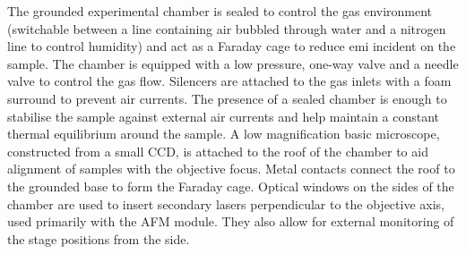 \documentclass{article}
\begin{document}
The grounded experimental chamber is sealed to control the gas environment (switchable between a line containing air bubbled through water and a nitrogen line to control humidity) and act as a Faraday cage to reduce \gls{emi} incident on the sample. The chamber is equipped with a low pressure, one-way valve and a needle valve to control the gas flow. Silencers are attached to the gas inlets with a foam surround to prevent air currents. The presence of a sealed chamber is enough to stabilise the sample against external air currents and help maintain a constant thermal equilibrium around the sample. A low magnification basic microscope, constructed from a small CCD, is attached to the roof of the chamber to aid alignment of samples with the objective focus. Metal contacts connect the roof to the grounded base to form the Faraday cage. Optical windows on the sides of the chamber are used to insert secondary lasers perpendicular to the objective axis, used primarily with the AFM module. They also allow for external monitoring of the stage positions from the side.

\FloatBarrier
\end{document}
